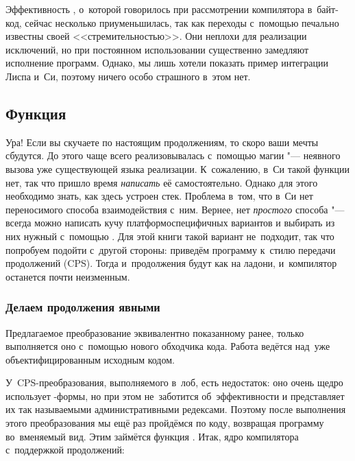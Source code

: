 Эффективность , о~которой говорилось при рассмотрении компилятора
в~байт-код, сейчас несколько приуменьшилась, так как переходы с~помощью
 печально известны своей <<стремительностью>>. Они неплохи для
реализации исключений, но при постоянном использовании существенно замедляют
исполнение программ. Однако, мы лишь хотели показать пример интеграции Лиспа
и~Си, поэтому ничего особо страшного в~этом нет.


\subsection{\texorpdfstring{Функция~\protect{}}{Функция call/cc}}%
\label{cc/call/cc/ssect:cc}

Ура! Если вы скучаете по настоящим продолжениям, то скоро ваши мечты сбудутся.
До этого  чаще всего реализовывалась с~помощью магии "--- неявного
вызова уже существующей  языка реализации. К~сожалению, в~Си такой
функции нет, так что пришло время \emph{написать} её самостоятельно. Однако для
этого необходимо знать, как здесь устроен стек. Проблема в~том, что в~Си нет
переносимого способа взаимодействия с~ним. Вернее, нет \emph{простого} способа
"--- всегда можно написать кучу платформоспецифичных вариантов и выбирать из них
нужный с~помощью . Для этой книги такой вариант не~подходит, так что
попробуем подойти с~другой стороны: приведём программу к~стилю передачи
продолжений (CPS). Тогда и~продолжения будут как на ладони, и~компилятор
останется почти неизменным.


\subsubsection{Делаем продолжения явными}\label{cc/call/cc/cc/ssect:explicit}

Предлагаемое преобразование эквивалентно показанному ранее, только выполняется
оно с~помощью нового обходчика кода. 
Работа ведётся над~уже объектифицированным исходным кодом.

У~CPS-преобразования, выполняемого в~лоб, есть недостаток: оно очень щедро
использует -формы, но при этом не~заботится об~эффективности и
представляет их так называемыми административными редексами. Поэтому после
выполнения этого преобразования мы ещё раз пройдёмся по коду, возвращая
программу во~вменяемый вид. Этим займётся функция . Итак, ядро
компилятора с~поддержкой продолжений:

